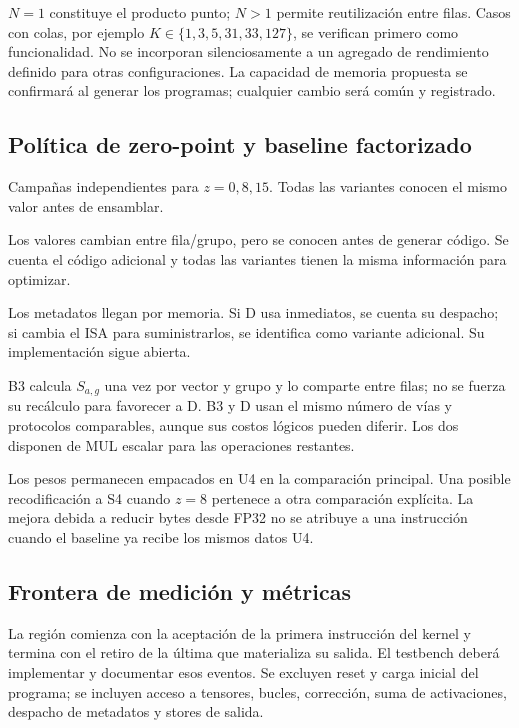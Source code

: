 \(N=1\) constituye el producto punto; \(N>1\) permite reutilización entre filas.
Casos con colas, por ejemplo \(K\in\{1,3,5,31,33,127\}\), se verifican primero
como funcionalidad. No se incorporan silenciosamente a un agregado de rendimiento
definido para otras configuraciones. La capacidad de memoria propuesta se
confirmará al generar los programas; cualquier cambio será común y registrado.

\subsection{Política de zero-point y baseline factorizado}
\begin{description}[style=nextline]
\item[ZC: constante por ejecución.] Campañas independientes para \(z=0,8,15\).
Todas las variantes conocen el mismo valor antes de ensamblar.
\item[ZS: especializado.] Los valores cambian entre fila/grupo, pero se conocen
antes de generar código. Se cuenta el código adicional y todas las variantes
tienen la misma información para optimizar.
\item[ZR: leído en ejecución.] Los metadatos llegan por memoria. Si D usa
inmediatos, se cuenta su despacho; si cambia el ISA para suministrarlos, se
identifica como variante adicional. Su implementación sigue abierta.
\end{description}

B3 calcula \(S_{a,g}\) una vez por vector y grupo y lo comparte entre filas;
no se fuerza su recálculo para favorecer a D. B3 y D usan el mismo número de
vías y protocolos comparables, aunque sus costos lógicos pueden diferir.
Los dos disponen de MUL escalar para las operaciones restantes.

Los pesos permanecen empacados en U4 en la comparación principal. Una posible
recodificación a S4 cuando \(z=8\) pertenece a otra comparación explícita.
La mejora debida a reducir bytes desde FP32 no se atribuye a una instrucción
cuando el baseline ya recibe los mismos datos U4.

\subsection{Frontera de medición y métricas}
La región comienza con la aceptación de la primera instrucción del kernel y
termina con el retiro de la última que materializa su salida. El testbench
deberá implementar y documentar esos eventos. Se excluyen reset y carga inicial
del programa; se incluyen acceso a tensores, bucles, corrección, suma de
activaciones, despacho de metadatos y stores de salida.

